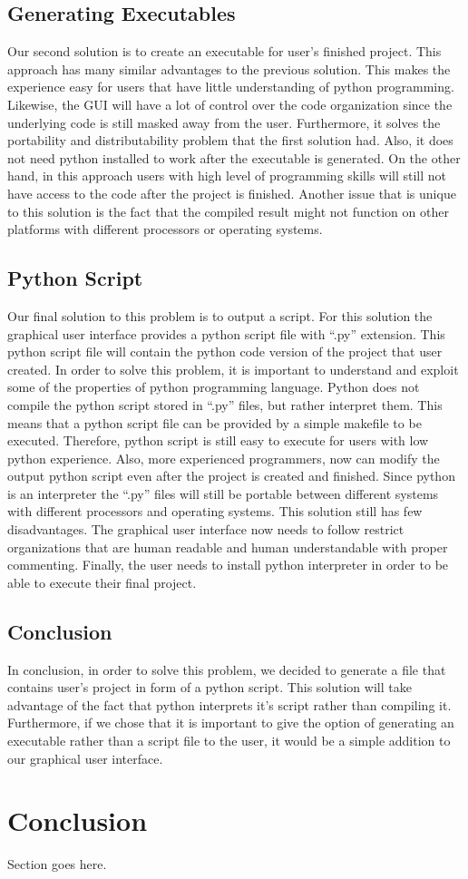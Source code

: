 \documentclass[journal,10pt,onecolumn,compsoc]{IEEEtran} \usepackage[margin=1.0in]{geometry} \usepackage{pdfpages} \usepackage{graphicx}
\begin{document}
\subsection{Generating Executables}
Our second solution is to create an executable for user’s finished project. 
This approach has many similar advantages to the previous solution. 
This makes the experience easy for users that have little understanding of python programming. 
Likewise, the GUI will have a lot of control over the code organization since the underlying code is still masked away from the user. 
Furthermore, it solves the portability and distributability problem that the first solution had. 
Also, it does not need python installed to work after the executable is generated. 
On the other hand, in this approach users with high level of programming skills will still not have access to the code after the project is finished. 
Another issue that is unique to this solution is the fact that the compiled result might not function on other platforms with different processors or operating systems.

\subsection{Python Script}
Our final solution to this problem is to output a script. For this solution the graphical user interface provides a python script file with “.py” extension. This python script file will contain the python code version of the project that user created. In order to solve this problem, it is important to understand and exploit some of the properties of python programming language. Python does not compile the python script stored in “.py” files, but rather interpret them. This means that a python script file can be provided by a simple makefile to be executed. Therefore, python script is still easy to execute for users with low python experience. Also, more experienced programmers, now can modify the output python script even after the project is created and finished. Since python is an interpreter the “.py” files will still be portable between different systems with different processors and operating systems. This solution still has few disadvantages. The graphical user interface now needs to follow restrict organizations that are human readable and human understandable with proper commenting. Finally, the user needs to install python interpreter in order to be able to execute their final project.

\subsection{Conclusion}
In conclusion, in order to solve this problem, we decided to generate a file that contains user’s project in form of a python script. This solution will take advantage of the fact that python interprets it’s script rather than compiling it. Furthermore, if we chose that it is important to give the option of generating an executable rather than a script file to the user, it would be a simple addition to our graphical user interface.

\newpage

\section{Conclusion}
Section goes here.
\newpage



\end{document}
